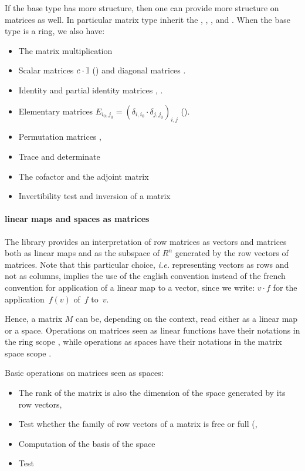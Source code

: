 If the base type has more structure, then one can provide more
structure on matrices as well. In particular matrix type inherit the
, , ,  and
. When the base type is a ring, we also have:
\begin{itemize}
\item The matrix multiplication \C{_ * _}
\item Scalar matrices $c\cdot \mathbb{I}$ () and diagonal matrices
  .
\item Identity  and partial identity matrices ,
  .
\item Elementary matrices
  $E_{i_0,j_0} = \left(\delta_{i,i_0}\cdot\delta_{j,j_0}\right)_{i,j}$
  ().
\item Permutation matrices , 
\item Trace  and determinate 
\item The cofactor  and the adjoint matrix
\item Invertibility test  and inversion of a matrix
\end{itemize}

\paragraph{linear maps and spaces as matrices}

The library  provides an interpretation of row
matrices as vectors and matrices both as linear maps and as the
subspace of $R^n$ generated by the row vectors of matrices. Note that
this particular choice, \textit{i.e.} representing vectors as rows and
not as columns, implies the use of the english convention instead of
the french convention for application of a linear map to a
vector, since we write: $v \cdot f$ for the application~$f(v)$ of~$f$
to~$v$.

Hence, a matrix $M$ can be, depending on the context, read either as a
linear map or a space. Operations on matrices seen as linear
functions have their notations in the ring scope , while
operations as spaces have their notations in the matrix space scope
.

Basic operations on matrices seen as spaces:
\begin{itemize}
\item The rank of the matrix is also the dimension of the space
  generated by its row vectors, 
\item Test whether the family of row vectors of a matrix is free or
  full (, 
\item Computation of the basis of the space
\item Test
\end{itemize}


